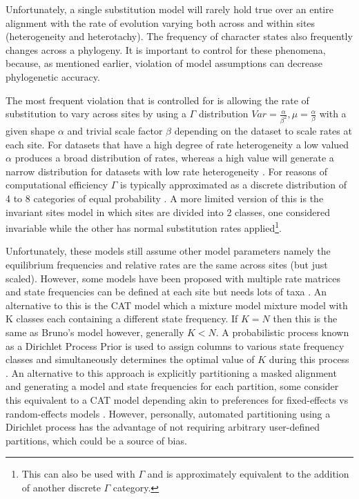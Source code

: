 Unfortunately, a single substitution model will rarely hold true over an entire
alignment with the rate of evolution varying both across and within sites (heterogeneity
and heterotachy). The frequency of character states also frequently changes
across a phylogeny.  It is important to control for these phenomena, because, 
as mentioned earlier, violation of model assumptions can decrease phylogenetic
accuracy.


The most frequent violation that is controlled for is allowing the rate of substitution to vary across
sites by using a \(\Gamma\) distribution \(Var = \frac{\alpha}{\beta^{2}}, \mu = \frac{\alpha}{\beta}\) with a given shape \(\alpha\) and 
trivial scale factor \(\beta\) depending on the dataset to scale rates at each site.
For datasets that have a high degree of rate heterogeneity a low valued \(\alpha\) produces a broad distribution of rates, whereas a high value will generate 
a narrow distribution for datasets with low rate heterogeneity \citep{Yang1993}.
For reasons of computational efficiency \(\Gamma\) is typically approximated as a discrete distribution of 4 to 8 
categories of equal probability \citep{Yang1994a}. 
A more limited version of this is the invariant sites model in which sites are divided into 2 classes, one considered invariable while the 
other has normal substitution rates applied\footnote{
    This can also be used with \(\Gamma\) and is approximately equivalent
to the addition of another discrete \(\Gamma\) category.}\citep{Hasegawa1985}.



Unfortunately, these models still assume other model parameters namely the equilibrium frequencies and relative rates are the same across
sites (but just scaled).  
However, some models have been proposed with multiple rate matrices \citep{Lartillot2004} and 
state frequencies can be defined at each site \citep{Bruno1996b} but needs lots of taxa \citep{Lartillot2004}.
An alternative to this is the CAT model which a mixture model mixture model with 
K classes each containing a different state frequency.  If \(K=N\) then this is
the same as Bruno's model however, generally \(K < N\).  A 
 probabilistic process known as a Dirichlet Process Prior is used to assign
 columns to various state frequency classes and simultaneously
 determines the optimal value of \(K\) during this process \citep{Lartillot2004}.
An alternative to this approach is explicitly partitioning a masked alignment
and generating a model and state frequencies for each partition, 
some consider this equivalent to a CAT model depending akin to preferences
for fixed-effects vs random-effects models \citep{Yang2012}.  However, personally,
automated partitioning using a Dirichlet process has the advantage of not
requiring arbitrary user-defined partitions, which could be a source of bias.


